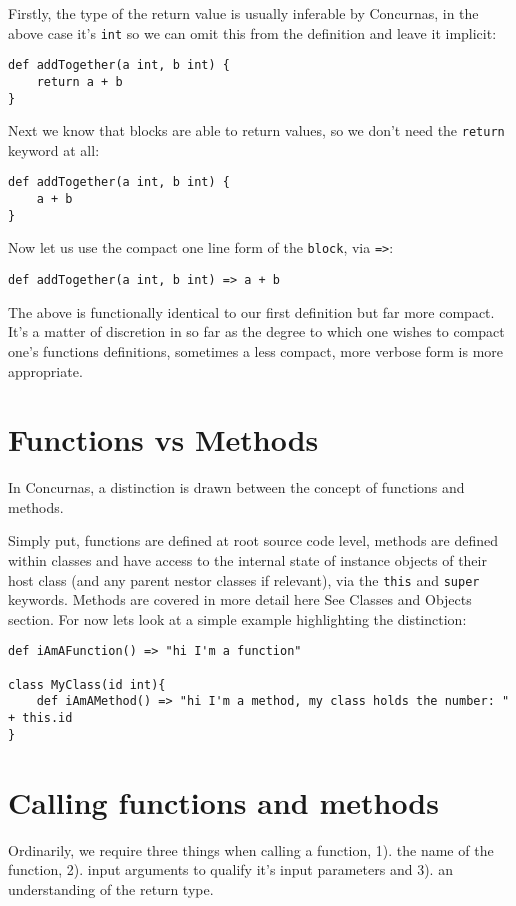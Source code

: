 \documentclass[conc-doc]{subfiles}
\begin{document}
Firstly, the type of the return value is usually inferable by Concurnas, in the above case it's \lstinline{int} so we can omit this from the definition and leave it implicit:

\begin{lstlisting}
def addTogether(a int, b int) {
	return a + b
}
\end{lstlisting}

Next we know that blocks are able to return values, so we don't need the \lstinline{return} keyword at all:

\begin{lstlisting}
def addTogether(a int, b int) {
	a + b
}
\end{lstlisting}

Now let us use the compact one line form of the \lstinline{block}, via \lstinline{=>}:

\begin{lstlisting}
def addTogether(a int, b int) => a + b
\end{lstlisting}

The above is functionally identical to our first definition but far more compact. It's a matter of discretion in so far as the degree to which one wishes to compact one's functions definitions, sometimes a less compact, more verbose form is more appropriate.

\section{Functions vs Methods}
In Concurnas, a distinction is drawn between the concept of functions and methods.

Simply put, functions are defined at root source code level, methods are defined within classes and have access to the internal state of instance objects of their host class (and any parent nestor classes if relevant), via the \lstinline{this} and \lstinline{super} keywords. Methods are covered in more detail here See Classes and Objects section. For now lets look at a simple example highlighting the distinction:


\begin{lstlisting}
def iAmAFunction() => "hi I'm a function"

class MyClass(id int){
	def iAmAMethod() => "hi I'm a method, my class holds the number: " + this.id
}
\end{lstlisting}

\section{Calling functions and methods}
Ordinarily, we require three things when calling a function, 1). the name of the function, 2). input arguments to qualify it's input parameters and 3). an understanding of the return type.
\end{document}
